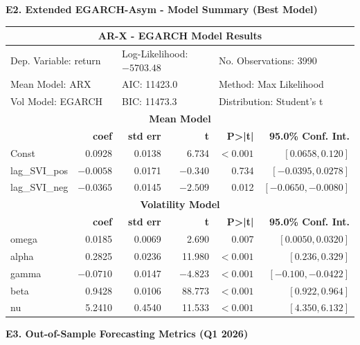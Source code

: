 \documentclass[12pt, a4paper]{article}
\begin{document}
\vspace{6pt}
\noindent\textbf{E2. Extended EGARCH-Asym - Model Summary (Best Model)}

\begin{center}
\footnotesize
\begin{tabular}{lrrrrr}
\toprule
\multicolumn{6}{c}{\textbf{AR-X - EGARCH Model Results}} \\
\midrule
\multicolumn{2}{l}{Dep. Variable: return} & \multicolumn{2}{l}{Log-Likelihood: $-5703.48$} & \multicolumn{2}{l}{No. Observations: 3990} \\
\multicolumn{2}{l}{Mean Model: ARX} & \multicolumn{2}{l}{AIC: 11423.0} & \multicolumn{2}{l}{Method: Max Likelihood} \\
\multicolumn{2}{l}{Vol Model: EGARCH} & \multicolumn{2}{l}{BIC: 11473.3} & \multicolumn{2}{l}{Distribution: Student's t} \\
\midrule
\multicolumn{6}{c}{\textbf{Mean Model}} \\
\midrule
 & \textbf{coef} & \textbf{std err} & \textbf{t} & \textbf{P>|t|} & \textbf{95.0\% Conf. Int.} \\
\midrule
Const & 0.0928 & 0.0138 & 6.734 & $<0.001$ & $[0.0658, 0.120]$ \\
lag\_SVI\_pos & $-0.0058$ & 0.0171 & $-0.340$ & 0.734 & $[-0.0395, 0.0278]$ \\
lag\_SVI\_neg & $-0.0365$ & 0.0145 & $-2.509$ & 0.012 & $[-0.0650, -0.0080]$ \\
\midrule
\multicolumn{6}{c}{\textbf{Volatility Model}} \\
\midrule
 & \textbf{coef} & \textbf{std err} & \textbf{t} & \textbf{P>|t|} & \textbf{95.0\% Conf. Int.} \\
\midrule
omega & 0.0185 & 0.0069 & 2.690 & 0.007 & $[0.0050, 0.0320]$ \\
alpha & 0.2825 & 0.0236 & 11.980 & $<0.001$ & $[0.236, 0.329]$ \\
gamma & $-0.0710$ & 0.0147 & $-4.823$ & $<0.001$ & $[-0.100, -0.0422]$ \\
beta & 0.9428 & 0.0106 & 88.773 & $<0.001$ & $[0.922, 0.964]$ \\
nu & 5.2410 & 0.4540 & 11.533 & $<0.001$ & $[4.350, 6.132]$ \\
\bottomrule
\end{tabular}
\end{center}

\vspace{6pt}
\noindent\textbf{E3. Out-of-Sample Forecasting Metrics (Q1 2026)}
\end{document}

